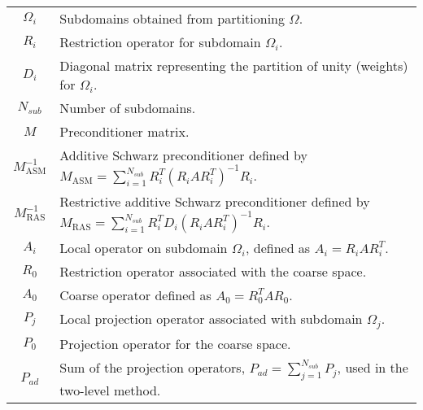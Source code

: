 \begin{longtable}{c p{10cm}}
    $\Omega_i$            & Subdomains obtained from partitioning $\Omega$.                                                                                  \\
    $R_i$                 & Restriction operator for subdomain $\Omega_i$.                                                                                   \\
    $D_i$                 & Diagonal matrix representing the partition of unity (weights) for $\Omega_i$.                                                    \\
    $N_{sub}$             & Number of subdomains.                                                                                                            \\
    $M$                   & Preconditioner matrix.                                                                                                           \\
    $M^{-1}_{\text{ASM}}$ & Additive Schwarz preconditioner defined by $M_{\text{ASM}} = \sum_{i=1}^{N_{sub}} R_i^T (R_i A R_i^T)^{-1} R_i$.                 \\
    $M^{-1}_{\text{RAS}}$ & Restrictive additive Schwarz preconditioner defined by $M_{\text{RAS}} = \sum_{i=1}^{N_{sub}} R_i^T D_i (R_i A R_i^T)^{-1} R_i$. \\
    $A_i$                 & Local operator on subdomain $\Omega_i$, defined as $A_i = R_i A R_i^T$.                                                          \\
    $R_0$                 & Restriction operator associated with the coarse space.                                                                           \\
    $A_0$                 & Coarse operator defined as $A_0 = R_0^T A R_0$.                                                                                  \\
    $P_j$                 & Local projection operator associated with subdomain $\Omega_j$.                                                                  \\
    $P_0$                 & Projection operator for the coarse space.                                                                                        \\
    $P_{ad}$              & Sum of the projection operators, $P_{ad} = \sum_{j=1}^{N_{sub}} P_j$, used in the two-level method.                              \\

\end{longtable}
